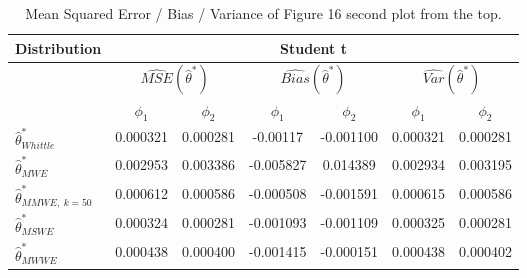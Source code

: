 \documentclass[
  11pt,
]{article}
\begin{document}
\begin{table}[h]
\centering
\begin{tabular}{|l|c|c|c|c|c|c|}
\hline
\multicolumn{1}{|c|}{\textbf{Distribution}} & \multicolumn{6}{c|}{\textbf{Student t}}                                                                                                                          \\ \hline
\textbf{}                                   & \multicolumn{2}{c|}{$\widehat{MSE}( \hat \theta^*)$} & \multicolumn{2}{c|}{$\widehat{Bias}( \hat \theta^*)$} & \multicolumn{2}{c|}{$\widehat{Var}( \hat \theta^*)$} \\ \hline
                                            & $\phi_1$                 & $\phi_2$                 & $\phi_1$                  & $\phi_2$                 & $\phi_1$                 & $\phi_2$                 \\ \hline
$\hat \theta^*_{Whittle}$                   & 0.000321                  & 0.000281                  & -0.00117                  & -0.001100                  & 0.000321                  & 0.000281                  \\ \hline
$\hat \theta^*_{MWE}$                       & 0.002953                  & 0.003386                  & -0.005827                   & 0.014389                 & 0.002934                  & 0.003195                  \\ \hline
$\hat \theta^*_{MMWE, \ k = 50}$            & 0.000612                  & 0.000586                  & -0.000508                  & -0.001591                  & 0.000615                  & 0.000586                  \\ \hline
$\hat \theta^*_{MSWE}$                      & 0.000324                  & 0.000281                  & -0.001093                  & -0.001109                  & 0.000325                  & 0.000281                  \\ \hline
$\hat \theta^*_{MWWE}$                      & 0.000438                  & 0.000400                  & -0.001415                  & -0.000151                  & 0.000438                  & 0.000402                  \\ \hline
\end{tabular}
\caption{Mean Squared Error / Bias / Variance of Figure 16 second plot from the top.}
\label{tab:AR2_Student_table}
\end{table}
\pagebreak
\end{document}
